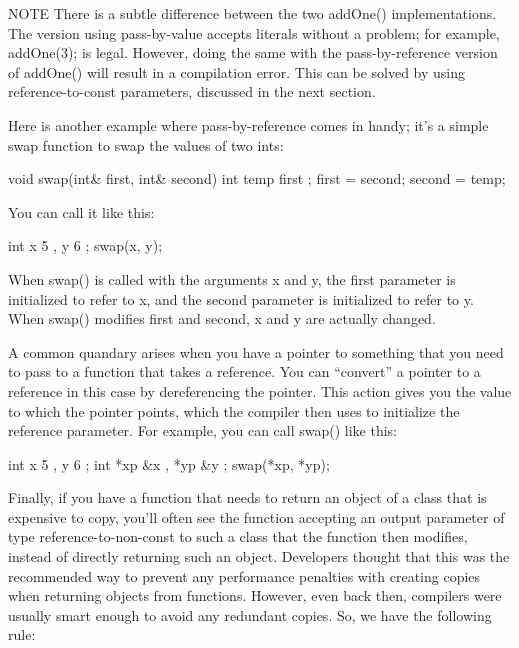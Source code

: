 \begin{myNotic}{NOTE}
There is a subtle difference between the two addOne() implementations. The version using pass-by-value accepts literals without a problem; for example, addOne(3); is legal. However, doing the same with the pass-by-reference version of addOne() will result in a compilation error. This can be solved by using reference-to-const parameters, discussed in the next section.
\end{myNotic}

Here is another example where pass-by-reference comes in handy; it’s a simple swap function to swap the values of two ints:

\begin{cpp}
void swap(int& first, int& second)
{
    int temp { first };
    first = second;
    second = temp;
}
\end{cpp}

You can call it like this:

\begin{cpp}
int x { 5 }, y { 6 };
swap(x, y);
\end{cpp}

When swap() is called with the arguments x and y, the first parameter is initialized to refer to x, and the second parameter is initialized to refer to y. When swap() modifies first and second, x and y are actually changed.

A common quandary arises when you have a pointer to something that you need to pass to a function that takes a reference. You can “convert” a pointer to a reference in this case by dereferencing the pointer. This action gives you the value to which the pointer points, which the compiler then uses to initialize the reference parameter. For example, you can call swap() like this:

\begin{cpp}
int x { 5 }, y { 6 };
int *xp { &x }, *yp { &y };
swap(*xp, *yp);
\end{cpp}

Finally, if you have a function that needs to return an object of a class that is expensive to copy, you’ll often see the function accepting an output parameter of type reference-to-non-const to such a class that the function then modifies, instead of directly returning such an object. Developers thought that this was the recommended way to prevent any performance penalties with creating copies when returning objects from functions. However, even back then, compilers were usually smart enough to avoid any redundant copies. So, we have the following rule:

